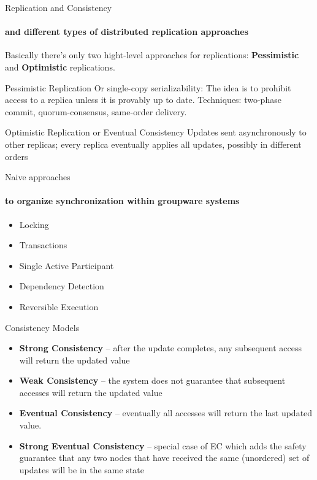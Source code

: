 \documentclass{beamer}
\begin{document}
\begin{frame}{Replication and Consistency}
\framesubtitle{and different types of distributed replication approaches}
Basically there's only two hight-level approaches for replications: \textbf{Pessimistic} and \textbf{Optimistic} replications.
\vspace{0.5cm}
\begin{block}{Pessimistic Replication}
Or single-copy serializability: The idea is to prohibit access to a replica unless it is provably up to date. Techniques: two-phase commit, quorum-consensus, same-order delivery.
\end{block}
\vspace{0.5cm}
\begin{block}{Optimistic Replication or Eventual Consistency}
Updates sent asynchronously to other replicas;
every replica eventually applies all updates, possibly in different orders
\end{block}

\end{frame}


\begin{frame}{Naive approaches}
\framesubtitle{to organize synchronization within groupware systems}

\begin{itemize}
  \item Locking
  \item Transactions
  \item Single Active Participant
  \item Dependency Detection
  \item Reversible Execution
\end{itemize}

\end{frame}

\begin{frame}{Consistency Models}

\begin{itemize}
 	\item \textbf{Strong Consistency} – after the update completes, any subsequent access will return the updated value
	\item \textbf{Weak Consistency} – the system does not guarantee that subsequent accesses will return the updated value
	\item \textbf{Eventual Consistency} – eventually all accesses will return the last updated value.
	\item \textbf{Strong Eventual Consistency} – special case of EC which adds the safety guarantee that any two nodes that have received the same (unordered) set of updates will be in the same state
\end{itemize}

\end{frame}
\end{document}
